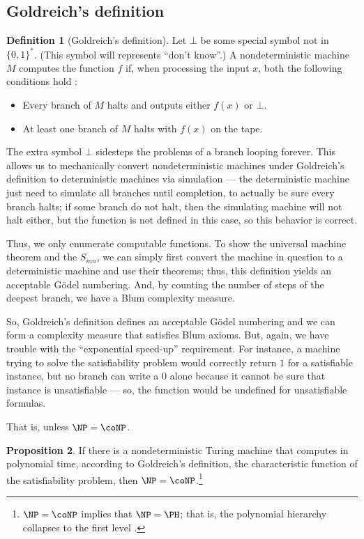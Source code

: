 \documentclass[12pt]{article}
\theoremstyle{definition}
\newtheorem{definition}{Definition}
\newtheorem{proposition}[definition]{Proposition}
\begin{document}
\subsection{Goldreich's definition}
\label{sec:goldreich}

\begin{definition}[Goldreich's definition]
    Let $\bot$ be some special symbol not in $\{0, 1\}^*$.
    (This symbol will represents ``don't know''.)
    A nondeterministic machine $M$ computes the function $f$ if,
    when processing the input $x$,
    both the following conditions hold \cite[p.~168]{Goldreich2008}:
    \begin{itemize}
        \item Every branch of $M$ halts
            and outputs either $f(x)$ or $\bot$.
        \item At least one branch of $M$ halts with $f(x)$ on the tape.
    \end{itemize}
\end{definition}
The extra symbol $\bot$ sidesteps the problems of a branch looping forever.
This allows us to mechanically convert nondeterministic machines
under Goldreich's definition
to deterministic machines via simulation
--- the deterministic machine just need to simulate all branches until completion,
to actually be sure every branch halts;
if some branch do not halt,
then the simulating machine will not halt either,
but the function is not defined in this case,
so this behavior is correct.

Thus, we only enumerate computable functions.
To show the universal machine theorem and the $S_{mn}$,
we can simply first convert the machine in question to a deterministic machine
and use their theorems;
thus, this definition yields an acceptable Gödel numbering.
And, by counting the number of steps of the deepest branch,
we have a Blum complexity measure.

So, Goldreich's definition defines an acceptable Gödel numbering
and we can form a complexity measure that satisfies Blum axioms.
But, again,
we have trouble with the ``exponential speed-up'' requirement.
For instance,
a machine trying to solve the satisfiability problem
would correctly return $1$ for a satisfiable instance,
but no branch can write a $0$ alone
because it cannot be sure that instance is unsatisfiable
--- so, the function would be undefined for unsatisfiable formulas.

That is, unless $\NP = \coNP$.

\begin{proposition}
    If there is a nondeterministic Turing machine
    that computes in polynomial time, according to Goldreich's definition,
    the characteristic function of the satisfiability problem,
    then $\NP = \coNP$.\footnote{
        $\NP = \coNP$ implies that $\NP = \PH$; that is,
        the polynomial hierarchy collapses to the first level \cite[p.~280]{Kozen2006}.
    }
\end{proposition}
\end{document}
